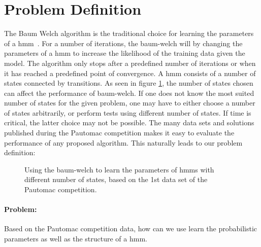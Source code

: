 \section{Problem Definition}

The Baum Welch algorithm is the traditional choice for learning the parameters of a \gls{hmm}~\cite{pautomacTR}. 
For a number of iterations, the \gls{baum-welch} will by changing the parameters of a \gls{hmm} to increase the likelihood of the training data given the model. The algorithm only stops after a predefined number of iterations or when it has reached a predefined point of convergence.
A \gls{hmm} consists of a number of states connected by transitions. As seen in figure \ref{fig:bw-states-are-important}, the number of states chosen can affect the performance of \gls{baum-welch}. If one does not know the most suited number of states for the given problem, one may have to either choose a number of states arbitrarily, or perform tests using different number of states. If time is critical, the latter choice may not be possible.
The many data sets and solutions published during the Pautomac competition makes it easy to evaluate the performance of any proposed algorithm.
This naturally leads to our problem definition:

\begin{figure}
\begin{centering}
\caption{Using the \gls{baum-welch} to learn the parameters of \gls{hmm}s with different number of states, based on the 1st data set of the Pautomac competition.}
\label{fig:bw-states-are-important} 
\end{centering}
\end{figure}


\paragraph{Problem:}
Based on the Pautomac competition data, how can we use learn the probabilistic parameters as well as the structure of a \gls{hmm}.